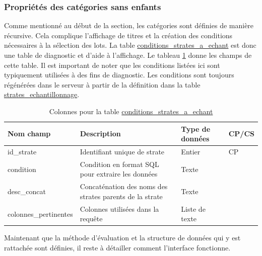         \subsubsection{Propriétés des catégories sans enfants}
        Comme mentionné au début de la section, les catégories sont définies de manière récursive. Cela complique l’affichage de titres et la création des conditions nécessaires à la sélection des lots. La table \ul{conditions\_strates\_a\_echant} est donc une table de diagnostic et d'aide à l'affichage. Le tableau \ref{tab:def-conditions-feuilles} donne les champs de cette table. Il est important de noter que les conditions listées ici sont typiquement utilisées à des fins de diagnostic. Les conditions sont toujours régénérées dans le serveur à partir de la définition dans la table \ul{strates\_echantillonnage}.
        \begin{table}[H]
            \caption{Colonnes pour la table \underline{conditions\_strates\_a\_echant}}
            \label{tab:def-conditions-feuilles}
            \centering
            \begin{tabular}{m{}|m{}m{}m{}}
                \hline
                Nom champ & Description & Type de données & CP/CS  \\
                \hline
                id\_strate & Identifiant unique de strate & Entier & CP \\
                condition & Condition en format SQL pour extraire les données & Texte & \\
                desc\_concat & Concaténation des noms des strates parents de la strate & Texte & \\
                colonnes\_pertinentes & Colonnes utilisées dans la requête & Liste de texte & \\
                \hline
           \end{tabular}
        \end{table}
        Maintenant que la méthode d'évaluation et la structure de données qui y est rattachée sont définies, il reste à détailler comment l'interface fonctionne.